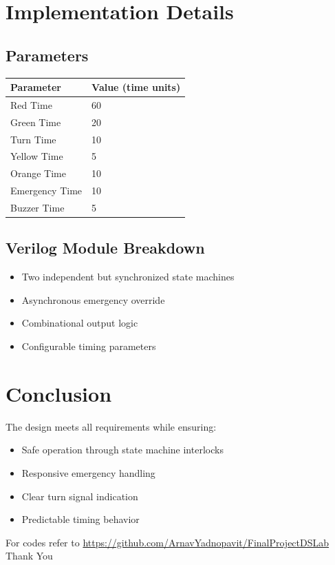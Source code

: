 \documentclass{article}
\begin{document}
\section{Implementation Details}

\subsection{Parameters}
\begin{tabular}{|l|l|}
\hline
Parameter & Value (time units) \\
\hline
Red Time & 60 \\
Green Time & 20 \\
Turn Time & 10 \\
Yellow Time & 5 \\
Orange Time & 10 \\
Emergency Time & 10 \\
Buzzer Time & 5 \\
\hline
\end{tabular}

\subsection{Verilog Module Breakdown}
\begin{itemize}
    \item Two independent but synchronized state machines
    \item Asynchronous emergency override
    \item Combinational output logic
    \item Configurable timing parameters
\end{itemize}

\section{Conclusion}
The design meets all requirements while ensuring:
\begin{itemize}
    \item Safe operation through state machine interlocks
    \item Responsive emergency handling
    \item Clear turn signal indication
    \item Predictable timing behavior
\end{itemize}
For codes refer to \url{https://github.com/ArnavYadnopavit/FinalProjectDSLab}\\

\centering
Thank You
\end{document}
